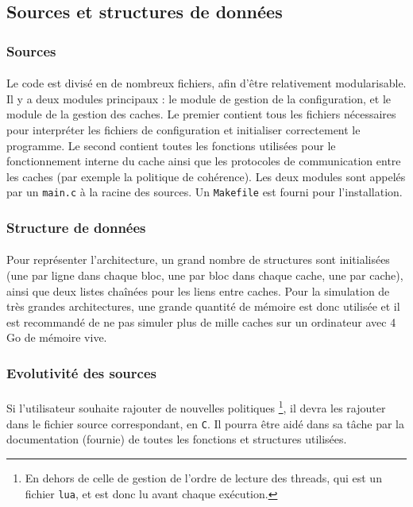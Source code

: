 \subsection{Sources et structures de données}

\subsubsection{Sources}
\paragraph{}
Le code est divisé en de nombreux fichiers, afin d'être relativement modularisable. Il y a deux modules principaux : le module de gestion de la configuration, et le module de la gestion des caches. Le premier contient tous les fichiers nécessaires pour interpréter les fichiers de configuration et initialiser correctement le programme. Le second contient toutes les fonctions utilisées pour le fonctionnement interne du cache ainsi que les protocoles de communication entre les caches (par exemple la politique de cohérence). Les deux modules sont appelés par un \verb!main.c! à la racine des sources. Un \verb!Makefile! est fourni pour l'installation.

\subsubsection{Structure de données}
\paragraph{}
Pour représenter l'architecture, un grand nombre de structures sont initialisées (une par ligne dans chaque bloc, une par bloc dans chaque cache, une par cache), ainsi que deux listes chaînées pour les liens entre caches. Pour la simulation de très grandes architectures, une grande quantité de mémoire est donc utilisée et il est recommandé de ne pas simuler plus de mille caches sur un ordinateur avec 4 Go de mémoire vive.

\subsubsection{Evolutivité des sources}
\paragraph{}
Si l'utilisateur souhaite rajouter de nouvelles politiques \footnote{En dehors de celle de gestion de l'ordre de lecture des threads, qui est un fichier \texttt{lua}, et est donc lu avant chaque exécution.}, il devra les rajouter dans le fichier source correspondant, en \texttt{C}. Il pourra être aidé dans sa tâche par la documentation (fournie) de toutes les fonctions et structures utilisées.
